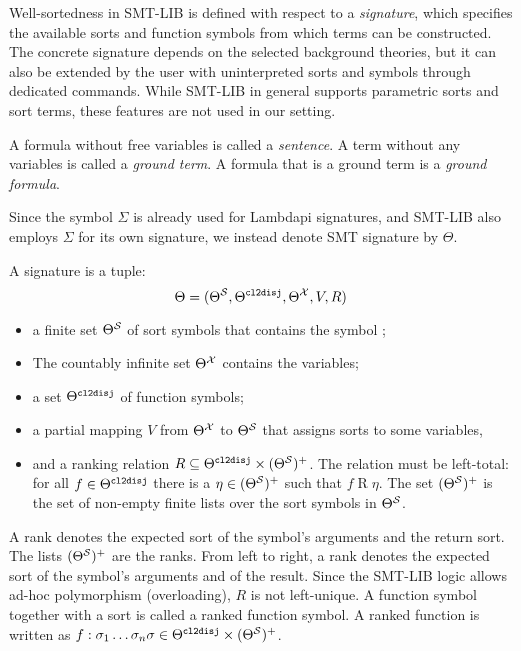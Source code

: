 Well-sortedness in SMT-LIB is defined with respect to a \emph{signature}, which specifies the available sorts and function symbols from which terms can be constructed.
The concrete signature depends on the selected background theories, but it can also be extended by the user with uninterpreted sorts and symbols through dedicated commands.
While SMT-LIB in general supports parametric sorts and sort terms, these features are not used in our setting.


A formula without free variables is called a \emph{sentence}.
A term without any variables is called a \emph{ground term}. A formula that is a ground term is a \emph{ground formula}.

\begin{notation}
Since the symbol $\Sigma$ is already used for Lambdapi signatures, and SMT-LIB also employs $\Sigma$ for its own signature, we instead denote SMT signature by $\Theta$.  
\end{notation}

\begin{definition}[Signature]\label{def:smt-signature}
A signature is a tuple:
\[
    \Theta = (\Theta^\cal{S}, \Theta^\cltodisj, \Theta^\cal{X}, V, R)
\]
\begin{itemize}
    \item  a finite set $\Theta^\cal{S}$  of sort symbols that contains the symbol ;
    \item The countably infinite set $\Theta^\cal{X}$ contains the variables;
    \item a set $\Theta^\cltodisj$ of function symbols;
    \item a partial mapping $V$ from $\Theta^\cal{X}$ to $\Theta^\cal{S}$ that assigns sorts to some variables,
    \item and a ranking relation $R \subseteq \Theta^\cltodisj \times (\Theta^\cal{S})^+$. The relation must be left-total: for
    all $f \in \Theta^\cltodisj$ there is a $\eta \in (\Theta^\cal{S})^+$ such that $f \mathrel{R} \eta$. The set $(\Theta^\cal{S})^+$ 
    is the set of non-empty finite lists over the sort symbols in $\Theta^\cal{S}$.
\end{itemize}
\end{definition}

A rank denotes the expected sort of the symbol's arguments and the return sort. The lists $(\Theta^\cal{S})^+$ are the ranks.
From left to right, a rank denotes the expected sort of the symbol's arguments and of the result.
Since the SMT-LIB logic allows ad-hoc polymorphism (overloading), $R$ is not left-unique.
A function symbol together with a sort is called a ranked function symbol.
A ranked function is written as $f: \sigma_1\dots\sigma_n\sigma \in \Theta^{\cltodisj} \times (\Theta^{\cal{S}})^+$.

